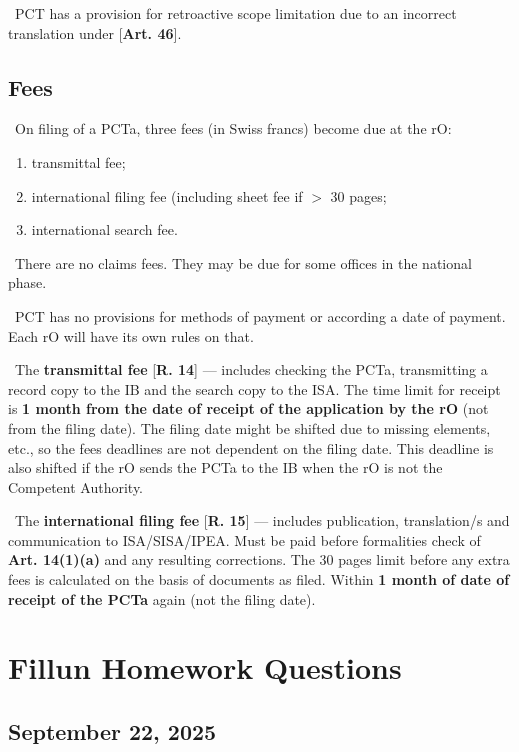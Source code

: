 \documentclass{report}
\newcommand{\n}{\newline}
\newcommand{\p}{\adforn{61} \ }
\begin{document}
\p PCT has a provision for retroactive scope limitation due to an incorrect translation under [\textbf{Art. 46}].

\section{Fees}

\p On filing of a PCTa, three fees (in Swiss francs) become due at the rO:

\begin{enumerate}
 \item transmittal fee;
 \item international filing fee (including sheet fee if $>$ 30 pages;
 \item international search fee.
\end{enumerate}

\p There are no claims fees. They may be due for some offices in the national phase. \n

\p PCT has no provisions for methods of payment or according a date of payment. Each rO will have its own rules on that. \n

\p The \textbf{transmittal fee} [\textbf{R. 14}] --- includes checking the PCTa, transmitting a record copy to the IB and the search copy to the ISA. The time limit for receipt is \textbf{1 month from the date of receipt of the application by the rO} (not from the filing date). The filing date might be shifted due to missing elements, etc., so the fees deadlines are not dependent on the filing date. This deadline is also shifted if the rO sends the PCTa to the IB when the rO is not the Competent Authority. \n

\p The \textbf{international filing fee} [\textbf{R. 15}] --- includes publication, translation/s and communication to ISA/SISA/IPEA. Must be paid before formalities check of \textbf{Art. 14(1)(a)} and any resulting corrections. The 30 pages limit before any extra fees is calculated on the basis of documents as filed. Within \textbf{1 month of date of receipt of the PCTa} again (not the filing date).




\newpage

\chapter{Fillun Homework Questions}

\section{September 22, 2025}
\end{document}
